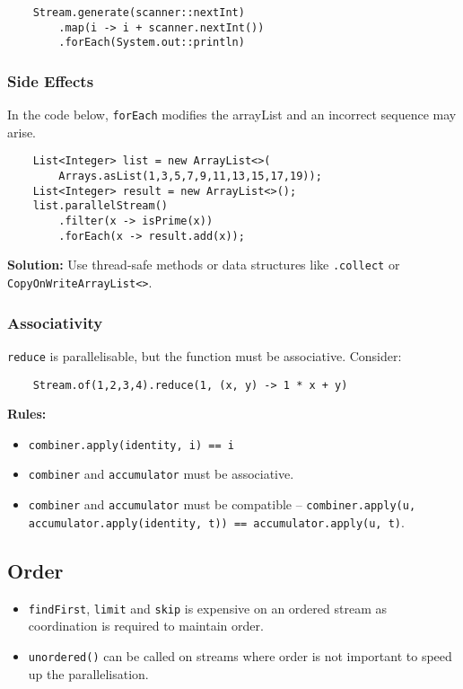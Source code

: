 \documentclass[10pt,landscape,a4paper]{article}
\begin{document}
\begin{multicols*}{4}
\begin{lstlisting}
    Stream.generate(scanner::nextInt)
        .map(i -> i + scanner.nextInt())
        .forEach(System.out::println)
\end{lstlisting}


\subsubsection{Side Effects}
In the code below, \texttt{forEach} modifies the arrayList and an incorrect sequence may arise.
\begin{lstlisting}
    List<Integer> list = new ArrayList<>(
        Arrays.asList(1,3,5,7,9,11,13,15,17,19));
    List<Integer> result = new ArrayList<>();
    list.parallelStream()
        .filter(x -> isPrime(x))
        .forEach(x -> result.add(x));
\end{lstlisting}
\textbf{Solution:} Use thread-safe methods or data structures like \texttt{.collect} or \texttt{CopyOnWriteArrayList<>}.
\subsubsection{Associativity}
\texttt{reduce} is parallelisable, but the function must be associative. Consider:
\begin{lstlisting}
    Stream.of(1,2,3,4).reduce(1, (x, y) -> 1 * x + y)
\end{lstlisting}
\textbf{Rules:}
\begin{itemize}
    \item \texttt{combiner.apply(identity, i) == i}
    \item \texttt{combiner} and \texttt{accumulator} must be associative.
    \item \texttt{combiner} and \texttt{accumulator} must be compatible -- \texttt{combiner.apply(u, accumulator.apply(identity, t)) == accumulator.apply(u, t)}.
\end{itemize}

\subsection{Order}
\begin{itemize}
    \item \texttt{findFirst}, \texttt{limit} and \texttt{skip} is expensive on an ordered stream as coordination is required to maintain order. \\
    \item \texttt{unordered()} can be called on streams where order is not important to speed up the parallelisation.
\end{itemize}


\end{multicols*}
\end{document}
